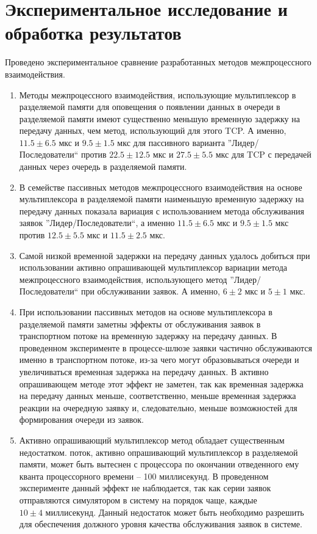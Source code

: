 \chapter{Экспериментальное исследование и обработка результатов}\label{chapter41}





\chapterconclusion

Проведено экспериментальное сравнение разработанных методов межпроцессного взаимодействия.
\begin{enumerate}
\item Методы межпроцессного взаимодействия, использующие мультиплексор в разделяемой памяти для оповещения о появлении данных в очереди в разделяемой памяти имеют существенно меньшую временную задержку на передачу данных, чем метод, использующий для этого TCP. А именно, $11.5 \pm 6.5 \text{ мкс и } 9.5 \pm 1.5 \text{ мкс}$ для пассивного варианта ''Лидер/Последователи`` против $22.5 \pm 12.5 \text{ мкс и } 27.5 \pm 5.5 \text{ мкс}$ для TCP с передачей данных через очередь в разделяемой памяти.
\item В семействе пассивных методов межпроцессного взаимодействия на основе мультиплексора в разделяемой памяти наименьшую временную задержку на передачу данных показала вариация с использованием метода обслуживания заявок ''Лидер/Последователи``, а именно $11.5 \pm 6.5 \text{ мкс и } 9.5 \pm 1.5 \text{ мкс}$ против $12.5 \pm 5.5 \text{ мкс и } 11.5 \pm 2.5 \text{ мкс}$.
\item Самой низкой временной задержки на передачу данных удалось добиться при использовании активно опрашивающей мультиплексор вариации метода межпроцессного взаимодействия, использующего метод ''Лидер/Последователи`` при обслуживании заявок. А именно, $6 \pm 2 \text{ мкс и } 5 \pm 1 \text{ мкс}$.
\item При использовании пассивных методов на основе мультиплексора в разделяемой памяти заметны эффекты от обслуживания заявок в транспортном потоке на временную задержку на передачу данных. В проведенном эксперименте в процессе-шлюзе заявки частично обслуживаются именно в транспортном потоке, из-за чего могут образовываться очереди и увеличиваться временная задержка на передачу данных. В активно опрашивающем методе этот эффект не заметен, так как временная задержка на передачу данных меньше, соответственно, меньше временная задержка реакции на очередную заявку и, следовательно, меньше возможностей для формирования очереди из заявок.
\item Активно опрашивающий мультиплексор метод обладает существенным недостатком. поток, активно опрашивающий мультиплексор в разделяемой памяти, может быть вытеснен с процессора по окончании отведенного ему кванта процессорного времени -- 100 миллисекунд. В проведенном эксперименте данный эффект не наблюдается, так как серии заявок отправляются симулятором в систему на порядок чаще, каждые $10 \pm 4 \text{ миллисекунд}$. Данный недостаток может быть необходимо разрешить для обеспечения должного уровня качества обслуживания заявок в системе.
\end{enumerate}